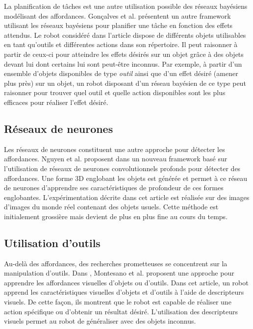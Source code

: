 \documentclass[draft]{llncs}
\begin{document}
La planification de tâches est une autre utilisation possible des réseaux bayésiens modélisant des affordances.
Gonçalves et al. présentent un autre framework utilisant les réseaux bayésiens \cite{Goncalves2014} pour planifier une tâche en fonction des effets attendus.
Le robot considéré dans l'article dispose de différents objets utilisables en tant qu'outils et différentes actions dans son répertoire.
Il peut raisonner à partir de ceux-ci pour atteindre les effets désirés sur un objet grâce à des objets devant lui dont certains lui sont peut-être inconnus.
Par exemple, à partir d'un ensemble d'objets disponibles de type \textit{outil} ainsi que d'un effet désiré (amener plus près) sur un objet, un robot disposant d'un réseau bayésien de ce type peut raisonner pour trouver quel outil et quelle action disponibles sont les plus efficaces pour réaliser l'effet désiré.




\subsection{Réseaux de neurones}

Les réseaux de neurones constituent une autre approche pour détecter les affordances.
Nguyen et al. proposent dans \cite{Nguyen2017} un nouveau framework basé sur l'utilisation de réseaux de neurones convolutionnels profonds pour détecter des affordances.
Une forme 3D englobant les objets est générée et permet à ce réseau de neurones d'apprendre ses caractéristiques de profondeur de ces formes englobantes.
L'expérimentation décrite dans cet article est réalisée sur des images d'images du monde réel contenant des objets usuels.
Cette méthode est initialement grossière mais devient de plus en plus fine au cours du temps.



\subsection{Utilisation d'outils}

Au-delà des affordances, des recherches prometteuses se concentrent sur la manipulation d'outils.
Dans \cite{Montesano2008}, Montesano et al. proposent une approche pour apprendre les affordances visuelles d'objets ou d'outils.
Dans cet article, un robot apprend les caractéristiques visuelles d'objets et d'outils à l'aide de descripteurs visuels.
De cette façon, ils montrent que le robot est capable de réaliser une action spécifique ou d'obtenir un résultat désiré.
L'utilisation des descripteurs visuels permet au robot de généraliser avec des objets inconnus.
\end{document}
